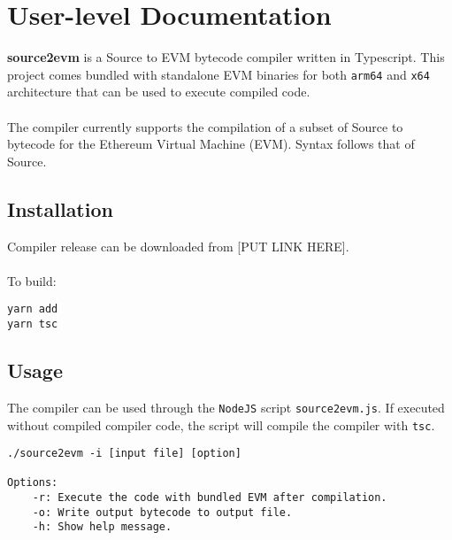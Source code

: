 \tableofcontents
\setcounter{secnumdepth}{3}
\newpage


\label{Chapter1} %


\newcommand{\keyword}[1]{\textbf{#1}}
\newcommand{\tabhead}[1]{\textbf{#1}}
\newcommand{\code}[1]{\texttt{#1}}
\newcommand{\file}[1]{\texttt{\bfseries#1}}
\newcommand{\option}[1]{\texttt{\itshape#1}}


\section{User-level Documentation}
\textbf{source2evm} is a Source to EVM bytecode compiler written in Typescript. This project comes bundled with standalone EVM binaries for both \code{arm64} and \code{x64} architecture that can be used to execute compiled code.\\\\
The compiler currently supports the compilation of a subset of Source to bytecode for the Ethereum Virtual Machine (EVM). Syntax follows that of Source. 

\subsection{Installation}
Compiler release can be downloaded from [PUT LINK HERE]. \\\\
To build: 
\begin{verbatim}
yarn add
yarn tsc
\end{verbatim}

\subsection{Usage}
The compiler can be used through the \code{NodeJS} script \code{source2evm.js}. If executed without compiled compiler code, the script will compile the compiler with \code{tsc}. 
\begin{verbatim}
./source2evm -i [input file] [option]

Options: 
    -r: Execute the code with bundled EVM after compilation. 
    -o: Write output bytecode to output file. 
    -h: Show help message. 
\end{verbatim}

